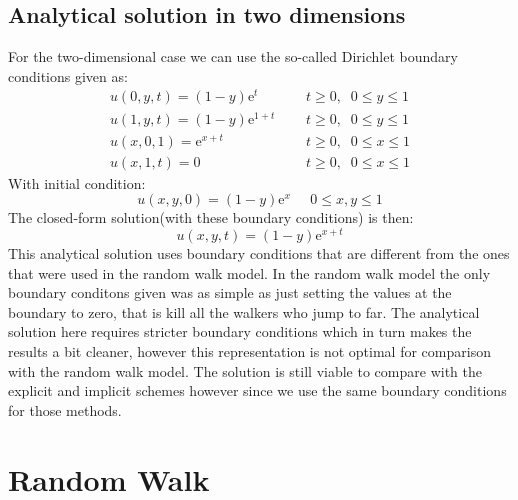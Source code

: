 \documentclass[a4paper,11pt]{article}
\newcommand{\secti}[1]{\centering \section{{#1}} \justifying} %
\newcommand{\me}{\mathrm{e}} %
\begin{document}
\subsection{Analytical solution in two dimensions}
    For the two-dimensional case we can use the so-called Dirichlet boundary conditions given as: 
    \begin{align*}
        u(0,y,t) = (1-y)\me^t\;\;\;\;\; &t\geq 0,\;\; 0\leq y\leq 1\\
        u(1,y,t) = (1-y)\me^{1+t}\;\;\;\;\; &t\geq 0,\;\; 0\leq y\leq 1\\
        u(x,0,1) = \me^{x+t}\;\;\;\;\; &t\geq 0,\;\; 0\leq x\leq 1\\
        u(x,1,t) = 0\;\;\;\;\; &t\geq 0,\;\; 0\leq x \leq 1
    \end{align*}
    With initial condition:
    \begin{equation*}
        u(x,y,0) = (1-y)\me^x\;\;\;\;\; 0\leq x,y\leq 1
    \end{equation*}
    The closed-form solution(with these boundary conditions) is then:
    \begin{equation*}
        u(x,y,t) = (1-y)\me^{x+t}
    \end{equation*}
    This analytical solution uses boundary conditions that are different from the ones that were used in the random walk model. In the random walk model the only boundary conditons given was as simple as just setting the values at the boundary to zero, that is kill all the walkers who jump to far. The analytical solution here requires stricter boundary conditions which in turn makes the results a bit cleaner, however this representation is not optimal for comparison with the random walk model. The solution is still viable to compare with the explicit and implicit schemes however since we use the same boundary conditions for those methods.

\secti{Random Walk}
\end{document}
